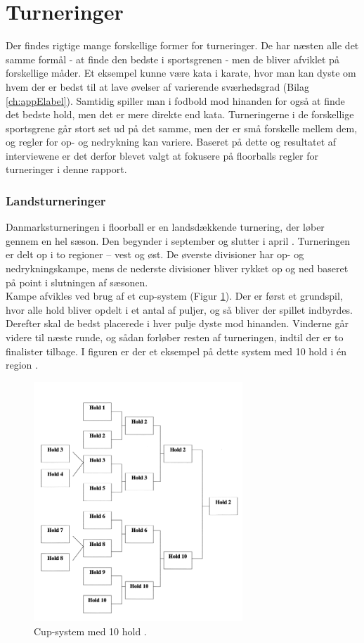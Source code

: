 \section{Turneringer}
Der findes rigtige mange forskellige former for turneringer. De har næsten alle det samme formål - at finde den bedste i sportsgrenen - men de bliver afviklet på forskellige måder. Et eksempel kunne være kata i karate, hvor man kan dyste om hvem der er bedst til at lave øvelser af varierende sværhedsgrad (Bilag \ref{ch:appElabel}). Samtidig spiller man i fodbold mod hinanden for også at finde det bedste hold, men det er mere direkte end kata. Turneringerne i de forskellige sportsgrene går stort set ud på det samme, men der er små forskelle mellem dem, og regler for op- og nedrykning kan variere. Baseret på dette og resultatet af interviewene er det derfor blevet valgt at fokusere på floorballs regler for turneringer i denne rapport.

\subsubsection{Landsturneringer}
Danmarksturneringen i floorball er en landsdækkende turnering, der løber gennem en hel sæson. Den begynder i september og slutter i april \cite{Landsturnering}. Turneringen er delt op i to regioner – vest og øst. De øverste divisioner har op- og nedrykningskampe, mens de nederste divisioner bliver rykket op og ned baseret på point i slutningen af sæsonen.\\
Kampe afvikles ved brug af et cup-system (Figur \ref{fig:cup-spil}). Der er først et grundspil, hvor alle hold bliver opdelt i et antal af puljer, og så bliver der spillet indbyrdes. Derefter skal de bedst placerede i hver pulje dyste mod hinanden. Vinderne går videre til næste runde, og sådan forløber resten af turneringen, indtil der er to finalister tilbage. I figuren er der et eksempel på dette system med 10 hold i én region \cite{Unihoc}\cite{Landsturnering}.

\begin{figure}[H]
  \centering
  \includegraphics[width=0.7\textwidth]{figures/cup-spil.png}
  \caption{Cup-system med 10 hold 
  \citep{staevnemappe}. }
  \label{fig:cup-spil}
\end{figure}

